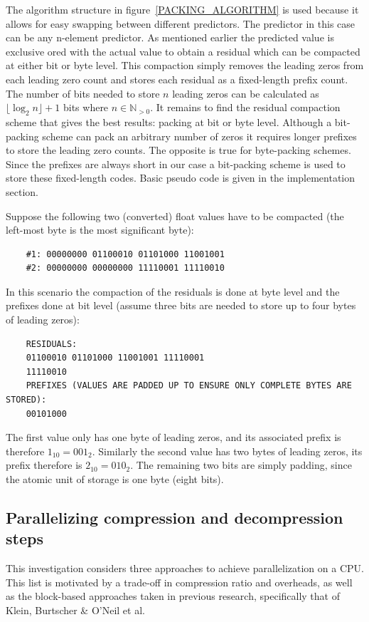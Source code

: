 The algorithm structure in figure~\ref{PACKING_ALGORITHM} is used because it allows for easy swapping between different predictors. The predictor in this case 
can be any n-element predictor. As mentioned earlier the predicted value is exclusive ored with the actual value to obtain a residual which can be compacted at either bit or byte level. This 
compaction simply removes the leading zeros from each leading zero count and stores each residual as a fixed-length prefix count. The number of bits needed to store $n$ leading 
zeros can be calculated as $\lfloor\log_2n\rfloor+1$ bits where $n\in\mathbb{N}_{>0}$. It remains to find the residual compaction scheme that gives the best results: packing at 
bit or byte level. Although a bit-packing scheme can pack an arbitrary number of zeros it requires longer prefixes to store the leading zero counts. The opposite is true 
for byte-packing schemes. Since the prefixes are always short in our case a bit-packing scheme is used to store these fixed-length codes. Basic pseudo code is given in the implementation section.

Suppose the following two (converted) float values have to be compacted (the left-most byte is the most significant byte):
\begin{center}
  \begin{verbatim}
    #1: 00000000 01100010 01101000 11001001
    #2: 00000000 00000000 11110001 11110010
  \end{verbatim}
\end{center}
In this scenario the compaction of the residuals is done at byte level and the prefixes done at bit level (assume three bits are needed to store up to four bytes of leading zeros): 
\begin{center}
  \begin{verbatim}
    RESIDUALS:
    01100010 01101000 11001001 11110001 
    11110010
    PREFIXES (VALUES ARE PADDED UP TO ENSURE ONLY COMPLETE BYTES ARE STORED):
    00101000
  \end{verbatim}
\end{center} 
The first value only has one byte of leading zeros, and its associated prefix is therefore $1_{10} = 001_{2}$. Similarly the second value has two bytes of leading zeros, its prefix therefore
is $2_{10} = 010_{2}$. The remaining two bits are simply padding, since the atomic unit of storage is one byte (eight bits).
\subsection{Parallelizing compression and decompression steps}
This investigation considers three approaches to achieve parallelization on a CPU. This list is motivated by a trade-off in compression ratio and overheads, as well as the block-based 
approaches taken in previous research, specifically that of Klein, Burtscher \& O'Neil et al. \cite{4976448,O'Neil:2011:FDC:1964179.1964189,klein2005parallel}
